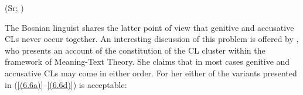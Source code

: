 \begin{exe}\ex\begin{xlist}
\strut\hfill (Sr; \citealt[659]{MrazovicVukadinovic09})
\end{xlist}
\end{exe}

\noindent The Bosnian linguist \citet[565]{Ridjanovic12} shares the latter point of view that genitive and accusative CLs never occur together. An interesting discussion of this problem is offered by \citet[104ff]{Milicevic07}, who presents an account of the constitution of the CL cluster within the framework of Meaning-Text Theory. She claims that in most cases genitive and accusative CLs may come in either order. For her either of the variants presented in (\ref{(6.6a)}--\ref{(6.6d)}) is acceptable:

